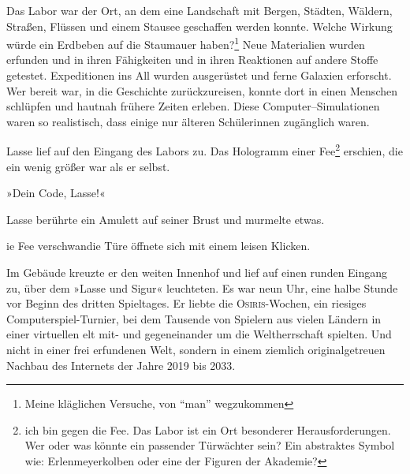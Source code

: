 Das Labor war der Ort, an dem eine Landschaft mit Bergen, Städten, Wäldern, Straßen,  Flüssen und einem Stausee geschaffen werden konnte. Welche Wirkung würde ein Erdbeben auf die Staumauer haben?\footnote{Meine kläglichen Versuche, von \enquote{man} wegzukommen}
Neue Materialien wurden erfunden und in ihren Fähigkeiten und in ihren Reaktionen auf andere Stoffe getestet.
Expeditionen ins All wurden ausgerüstet und ferne Galaxien erforscht.
Wer bereit war, in die Geschichte zurückzureisen, konnte dort in einen Menschen schlüpfen und hautnah frühere Zeiten erleben.
 Diese Computer--Simulationen waren so realistisch, dass einige  nur  älteren Schülerinnen zugänglich waren.

Lasse lief auf den Eingang des Labors zu. Das Hologramm einer Fee\footnote{ich bin gegen die Fee. Das Labor ist ein Ort besonderer Herausforderungen. Wer oder was könnte ein passender Türwächter sein? Ein abstraktes Symbol wie: Erlenmeyerkolben oder eine der Figuren der Akademie?} erschien, die ein wenig größer war als er selbst.

»Dein Code, Lasse!«

Lasse berührte ein Amulett auf seiner Brust und murmelte etwas.


ie Fee verschwandie Türe öffnete sich mit einem leisen Klicken.

Im Gebäude kreuzte er den weiten Innenhof und lief auf einen runden Eingang zu, über dem  »Lasse und Sigur« leuchteten.
Es war neun Uhr, eine halbe Stunde vor Beginn des dritten Spieltages.
Er liebte die \textsc{Osiris}-Wochen, ein riesiges Computerspiel-Turnier, bei dem Tausende von Spielern aus vielen Ländern in einer virtuellen elt mit- und gegeneinander um die Weltherrschaft spielten.
Und nicht in einer frei erfundenen Welt, sondern in einem ziemlich originalgetreuen Nachbau des Internets der Jahre 2019 bis 2033.


